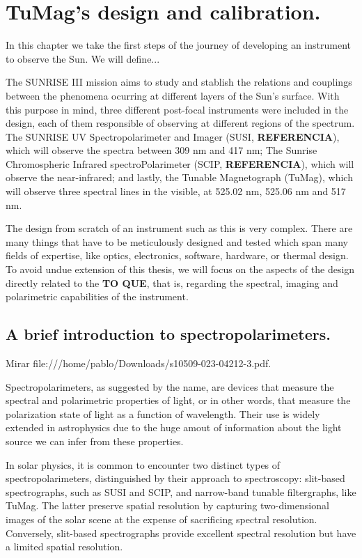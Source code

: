 \chapter{TuMag's design and calibration.}

In this chapter we take the first steps of the journey of developing an instrument to observe the Sun. We will define... 

The SUNRISE III mission aims to study and stablish the relations and couplings between the phenomena ocurring at different layers of the Sun's surface. With this purpose in mind, three different post-focal instruments were included in the design, each of them responsible of observing at different regions of the spectrum. The SUNRISE UV Spectropolarimeter and Imager (SUSI, \textbf{REFERENCIA}), which will observe the spectra between 309 nm and 417 nm; The Sunrise Chromospheric Infrared spectroPolarimeter (SCIP, \textbf{REFERENCIA}), which will observe the near-infrared; and lastly, the Tunable Magnetograph (TuMag), which will observe three spectral lines in the visible, at 525.02 nm, 525.06 nm and 517 nm. 

The design from scratch of an instrument such as this is very complex. There are many things that have to be meticulously designed and tested which span many fields of expertise, like optics, electronics, software, hardware, or thermal design. To avoid undue extension of this thesis, we will focus on the aspects of the design directly related to the \textbf{TO QUE}, that is, regarding the spectral, imaging and polarimetric capabilities of the instrument. 

\section{A brief introduction to spectropolarimeters.}


Mirar file:///home/pablo/Downloads/s10509-023-04212-3.pdf.

Spectropolarimeters, as suggested by the name, are devices that measure the spectral and polarimetric properties of light, or in other words, that measure the polarization state of light as a function of wavelength. Their use is widely extended in astrophysics due to the huge amout of information about the light source we can infer from these properties.

In solar physics, it is common to encounter two distinct types of spectropolarimeters, distinguished by their approach to spectroscopy: slit-based spectrographs, such as SUSI and SCIP, and narrow-band tunable filtergraphs, like TuMag. The latter preserve spatial resolution by capturing two-dimensional images of the solar scene at the expense of sacrificing spectral resolution. Conversely, slit-based spectrographs provide excellent spectral resolution but have a limited spatial resolution. 

